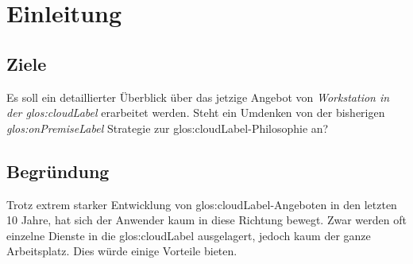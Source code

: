 \chapter{Einleitung}

\section{Ziele}
Es soll ein detaillierter Überblick über das jetzige Angebot von \textit{Workstation in der \Gls{glos:cloudLabel}} erarbeitet werden.
Steht ein Umdenken von der bisherigen \textit{\gls{glos:onPremiseLabel}} Strategie zur \Gls{glos:cloudLabel}-Philosophie an?

\section{Begründung}
Trotz extrem starker Entwicklung von \Gls{glos:cloudLabel}-Angeboten in den letzten 10 Jahre, hat sich der Anwender kaum in diese Richtung bewegt.
Zwar werden oft einzelne Dienste in die \Gls{glos:cloudLabel} ausgelagert, jedoch kaum der ganze Arbeitsplatz. Dies würde einige Vorteile bieten.
